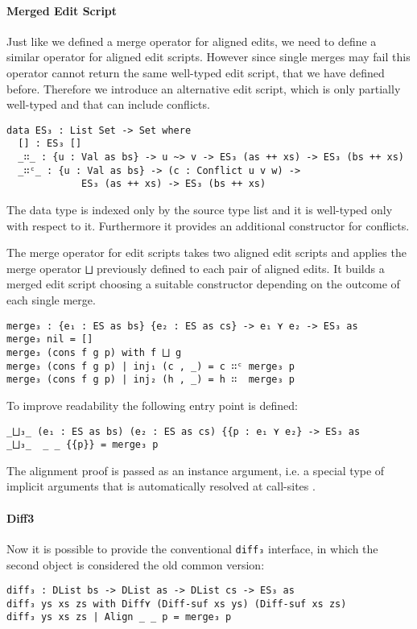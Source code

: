 \documentclass[preprint]{sigplanconf}
\begin{document}
	\paragraph{Merged Edit Script}
	Just like we defined a merge operator for aligned edits, we need to 
	define a similar operator for aligned edit scripts.
	However since single merges may fail this operator cannot return 
	the same well-typed edit script, that we have defined before.
	Therefore we introduce an alternative edit script, which is only partially 
	well-typed and that can include conflicts.
\begin{verbatim}
data ES₃ : List Set -> Set where
  [] : ES₃ []
  _∷_ : {u : Val as bs} -> u ~> v -> ES₃ (as ++ xs) -> ES₃ (bs ++ xs)
  _∷ᶜ_ : {u : Val as bs} -> (c : Conflict u v w) -> 
             ES₃ (as ++ xs) -> ES₃ (bs ++ xs)
\end{verbatim}
	The data type is indexed only by the source type list and it is well-typed
	only with respect to it. Furthermore it provides an additional constructor
	for conflicts. 

	The merge operator for edit scripts takes two aligned edit scripts and
	applies the merge operator \texttt{⨆} previously defined to
	each pair of aligned edits. It builds a merged edit script choosing a 
	suitable constructor depending on the outcome of each single merge.

\begin{verbatim}
merge₃ : {e₁ : ES as bs} {e₂ : ES as cs} -> e₁ ⋎ e₂ -> ES₃ as
merge₃ nil = []
merge₃ (cons f g p) with f ⨆ g
merge₃ (cons f g p) | inj₁ (c , _) = c ∷ᶜ merge₃ p
merge₃ (cons f g p) | inj₂ (h , _) = h ∷  merge₃ p
\end{verbatim}
	To improve readability the following entry point is defined:
\begin{verbatim}
_⨆₃_ (e₁ : ES as bs) (e₂ : ES as cs) {{p : e₁ ⋎ e₂} -> ES₃ as
_⨆₃_  _ _ {{p}} = merge₃ p
\end{verbatim}
	The alignment proof is passed as an instance argument, i.e. a special type 
	of implicit arguments that is automatically resolved at call-sites 
	\cite{Devriese11}.

	\paragraph{Diff3}
	Now it is possible to provide the conventional \texttt{diff₃} interface, in
	which the second object is considered the old common version:
\begin{verbatim}
diff₃ : DList bs -> DList as -> DList cs -> ES₃ as
diff₃ ys xs zs with Diff⋎ (Diff-suf xs ys) (Diff-suf xs zs)
diff₃ ys xs zs | Align _ _ p = merge₃ p
\end{verbatim}
\end{document}
